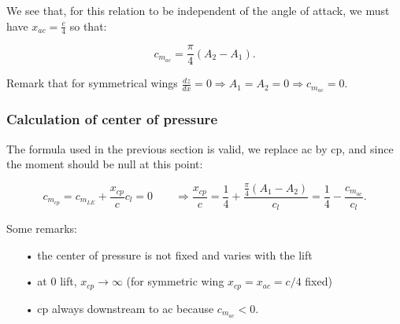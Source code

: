 	We see that, for this relation to be independent of the angle of attack, we must have $x_{ac} = \frac{c}{4}$ so that: 
	
	\begin{equation}
	c_{m_{ac}} = \frac{\pi}{4} (A_2 - A_1).
	\label{eq:2.77}
	\end{equation}
	
	Remark that for symmetrical wings $\frac{dz}{dx} = 0 \Rightarrow A_1 = A_2 = 0 \Rightarrow c_{m_{ac}} = 0$. 
	
\subsubsection{Calculation of center of pressure}
	The formula used in the previous section is valid, we replace ac by cp, and since the moment should be null at this point:
	
	\begin{equation}
	c_{m_{cp}} = c_{m_{LE}} + \frac{x_{cp}}{c} c_l = 0 \qquad \Rightarrow \frac{x_{cp}}{c} = \frac{1}{4} + \frac{\frac{\pi}{4}(A_1-A_2)}{c_l} = \frac{1}{4} - \frac{c_{m_{ac}}}{c_l}.
	\end{equation}
	
	Some remarks: 
	
	\begin{itemize}
	\item[•] the center of pressure is not fixed and varies with the lift
	\item[•] at 0 lift, $x_{cp}\rightarrow \infty$ (for symmetric wing $x_{cp} = x_{ac} = c/4$ fixed)
	\item[•] cp always downstream to ac because $c_{m_{ac}}<0$.
	\end{itemize}
	
